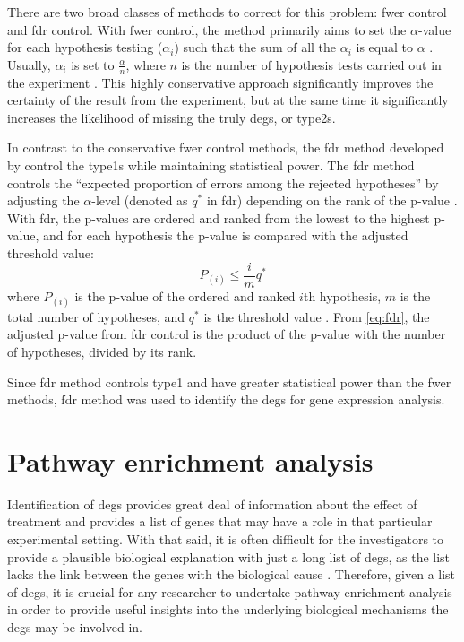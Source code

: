 There are two broad classes of methods to correct for this problem: \gls{fwer} control and \gls{fdr} control.
With \gls{fwer} control, the method primarily aims to set the $\alpha$-value for each hypothesis testing ($\alpha_i$) such that the sum of all the $\alpha_i$ is equal to $\alpha$ \citep{Hochberg1987,Shaffer1995}.
Usually, $\alpha_i$ is set to $\frac{\alpha}{n}$, where $n$ is the number of hypothesis tests carried out in the experiment \citep{Shaffer1995}.
This highly conservative approach significantly improves the certainty of the result from the experiment, but at the same time it significantly increases the likelihood of missing the truly \glspl{deg}, or \glspl{type2}.

In contrast to the conservative \gls{fwer} control methods, the \gls{fdr} method developed by \citet{Benjamini1995a} control the \glspl{type1} while maintaining statistical \gls{power}.
The \gls{fdr} method controls the ``expected proportion of errors among the rejected hypotheses'' by adjusting the $\alpha$-level (denoted as $q^*$ in \gls{fdr}) depending on the rank of the p-value \citep{Benjamini1995a}.
With \gls{fdr}, the p-values are ordered and ranked from the lowest to the highest p-value, and for each hypothesis the p-value is compared with the adjusted threshold value:
\begin{equation}
	\label{eq:fdr}
	P_{(i)} \leq \frac{i}{m}q^*
\end{equation}
where $P_{(i)}$ is the p-value of the ordered and ranked $i$th hypothesis, $m$ is the total number of hypotheses, and $q^*$ is the threshold value \citep{Benjamini1995a}.
From \cref{eq:fdr}, the adjusted p-value from \gls{fdr} control is the product of the p-value with the number of hypotheses, divided by its rank.

Since \gls{fdr} method controls \gls{type1} and have greater statistical \gls{power} than the \gls{fwer} methods, \gls{fdr} method was used to identify the \glspl{deg} for gene expression analysis.

\section{Pathway enrichment analysis}
\label{sec:pathway_enrichment_analysis}

Identification of \glspl{deg} provides great deal of information about the effect of treatment and provides a list of genes that may have a role in that particular experimental setting.
With that said, it is often difficult for the investigators to provide a plausible biological explanation with just a long list of \glspl{deg}, as the list lacks the link between the genes with the biological cause \citep{Khatri2012}.
Therefore, given a list of \glspl{deg}, it is crucial for any researcher to undertake pathway enrichment analysis in order to provide useful insights into the underlying biological mechanisms the \glspl{deg} may be involved in.

